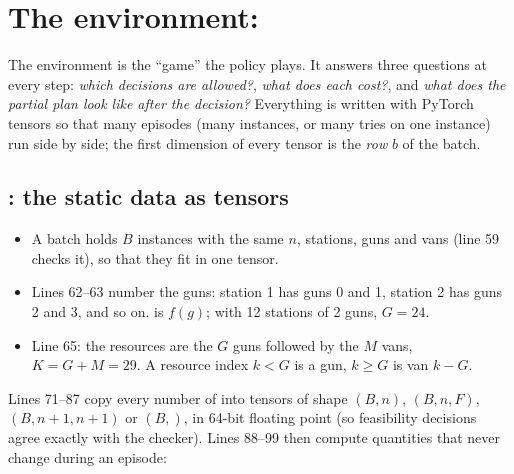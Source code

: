 \section{The environment: }
\label{sec:env}

The environment is the ``game'' the policy plays. It answers three questions at every step: \emph{which decisions are allowed?}, \emph{what does each cost?}, and \emph{what does the partial plan look like after the decision?} Everything is written with PyTorch tensors so that many episodes (many instances, or many tries on one instance) run side by side; the first dimension of every tensor is the \emph{row} $b$ of the batch.

\subsection{: the static data as tensors}


\begin{itemize}
  \item A batch holds $B$ instances with the same $n$, stations, guns and vans (line 59 checks it), so that they fit in one tensor.
  \item Lines 62--63 number the guns: station 1 has guns 0 and 1, station 2 has guns 2 and 3, and so on.  is $f(g)$; with 12 stations of 2 guns, $G=24$.
  \item Line 65: the resources are the $G$ guns followed by the $M$ vans, $K=G+M=29$. A resource index $k<G$ is a gun, $k\ge G$ is van $k-G$.
\end{itemize}

Lines 71--87 copy every number of  into tensors of shape $(B,n)$, $(B,n,F)$, $(B,n{+}1,n{+}1)$ or $(B,)$, in 64-bit floating point (so feasibility decisions agree exactly with the checker). Lines 88--99 then compute quantities that never change during an episode:


